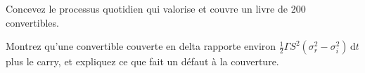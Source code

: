 \begin{interviewq}\label{iq:s2:convertible-arbitrage:5}
Concevez le processus quotidien qui valorise et couvre un livre de 200 convertibles.
\end{interviewq}

\begin{interviewq}\label{iq:s2:convertible-arbitrage:6}
Montrez qu'une convertible couverte en delta rapporte environ $\tfrac12\Gamma S^2(\sigma_r^2 - \sigma_i^2)\,\mathrm{d}t$ plus le carry, et expliquez ce que fait un
défaut à la couverture.
\end{interviewq}
